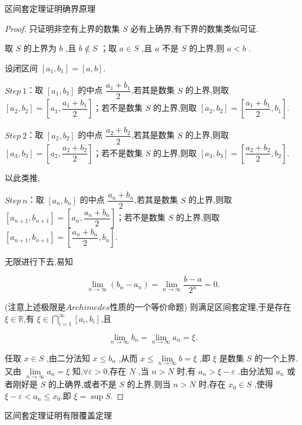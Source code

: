 \begin{proposition}
	区间套定理证明确界原理
\end{proposition}

\begin{proof}
	只证明非空有上界的数集 $S$ 必有上确界,有下界的数集类似可证.

取 $S$ 的上界为 $b$ ,且 $b \notin S$ ；取 $a \in S$ ,且 $a$ 不是 $S$ 的上界,则 $a < b$ .

设闭区间 $[a_1, b_1] = [a, b]$. 

$Step\ 1$：取 $[a_1, b_1]$ 的中点 $\dfrac{a_1 + b_1}{2}$,若其是数集 $S$ 的上界,则取 $[a_2, b_2] = \left[a_1, \dfrac{a_1 + b_1}{2}\right]$；若不是数集 $S$ 的上界,则取 $[a_2, b_2] = \left[\dfrac{a_1 + b_1}{2}, b_1\right]$.

$Step\ 2$：取 $[a_2, b_2]$ 的中点 $\dfrac{a_2 + b_2}{2}$,若其是数集 $S$ 的上界,则取 $[a_3, b_3] = \left[a_2, \dfrac{a_2 + b_2}{2}\right]$；若不是数集 $S$ 的上界,则取 $[a_3, b_3] = \left[\dfrac{a_2 + b_2}{2}, b_2\right]$.

以此类推,

$Step\ n$：取 $[a_n, b_n]$ 的中点 $\dfrac{a_n + b_n}{2}$,若其是数集 $S$ 的上界,则取 $[a_{n+1}, b_{n+1}] = \left[a_n, \dfrac{a_n + b_n}{2}\right]$；若不是数集 $S$ 的上界,则取 $[a_{n+1}, b_{n+1}] = \left[\dfrac{a_n + b_n}{2}, b_n\right]$.

无限进行下去,易知

$$\lim\limits_{n \to \infty} (b_n - a_n) = \lim_{n \to \infty} \frac{b - a}{2^n} = 0. $$

(注意上述极限是$Archimedes$性质的一个等价命题) 则满足区间套定理,于是存在 $\xi \in \mathbb{R}$,有 $\xi \in \bigcap_{i=1}^{\infty} [a_i, b_i]$,且

$$\lim_{n \to \infty} b_n = \lim_{n \to \infty} a_n = \xi. $$

任取 $x \in S$ ,由二分法知 $x \leqslant b_n$ ,从而 $x \leqslant \lim\limits_{n \to \infty} b = \xi$ ,即 $\xi$ 是数集 $S$ 的一个上界.又由 $\lim\limits_{n \to \infty} a_n = \xi$ 知,$\forall \varepsilon > 0$,存在 $N$ ,当 $n > N$ 时,有 $a_n > \xi - \varepsilon$ .由分法知 $a_n$ 或者刚好是 $S$ 的上确界,或者不是 $S$ 的上界,则当 $n > N$ 时,存在 $x_0 \in S$ ,使得 $\xi - \varepsilon < a_n \leqslant x_0$.即 $\xi = \sup S$.
\end{proof}
\begin{proposition}
	区间套定理证明有限覆盖定理
\end{proposition}

